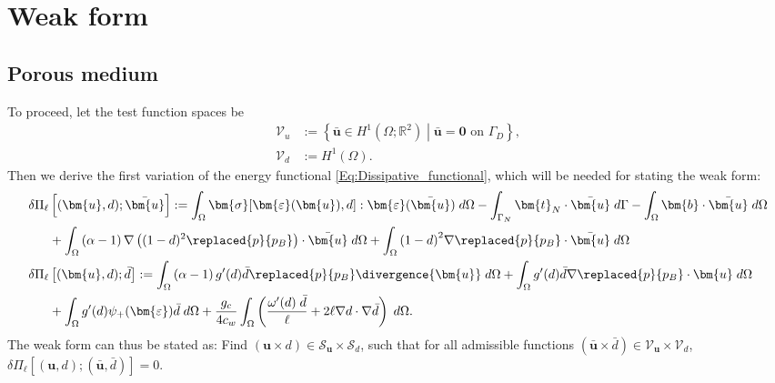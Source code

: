 \section{Weak form }\label{sub:weak_porous}
\subsection{Porous medium}
To proceed, let the test function spaces be
\begin{equation*}
    \begin{aligned}
        \mathscr{V}_u &:= \left\{\bar{\bm{u}}\in H^1\left(\Omega; \mathbb{R}^2\right) \middle|
        \bar{\bm{u}} = \mathbf{0} \text{ on } \Gamma_D
        \right\},\\
        \mathscr{V}_d &:= H^1(\Omega).
    \end{aligned}
\end{equation*}
Then we derive the first variation of the energy functional \eqref{Eq:Dissipative_functional}, which will be needed for stating the weak form:
\begin{equation} \label{Eq:Residual}
    \begin{aligned}
	    \delta \Pi_\ell & \left[(\bm{u}, d); \bar{\bm{u}} \right]
	    := \int_\Omega \bm{\sigma}[\bm{\varepsilon}(\bm{u}), d] : \bm{\varepsilon}(\bar{\bm{u}}) \;d\Omega - \int_{\Gamma_N} \bm{t}_N\cdot \bar{\bm{u}} \; d\Gamma - \int_\Omega \bm{b} \cdot\bar{\bm{u}}\; d\Omega \\
	    &+\int_{\Omega} \left(\alpha-1\right) \nabla \left((1-d)^2  \replaced{p}{p_B}\right) \cdot \bar{\bm{u}} \; d\Omega + \int_{\Omega}  {\left(1 - d\right)}^2\nabla \replaced{p}{p_B}\cdot \bar{\bm{u}}  \; d\Omega
	    \\ \delta \Pi_\ell & \left[(\bm{u}, d);  \bar{d} \right]
	    	    := \int_{\Omega} \left(\alpha-1\right)g'(d)\bar{d} \replaced{p}{p_B} \divergence{\bm{u}} \; d\Omega +	\int_{\Omega} g'(d)\bar{d}   \nabla \replaced{p}{p_B} \cdot {\bm{u}} \; d\Omega 
        \\
	    & + \int_\Omega g'(d) \psi_+(\bm{\varepsilon}) \bar{d}  \; d\Omega +
	    \frac{g_c}{4c_w} \int_\Omega  \left(\frac{\omega'(d)\;\bar{d}}{\ell} + 2\ell \nabla d\cdot\nabla \bar{d} \right)\;d\Omega.
	\end{aligned}
\end{equation}
The weak form can thus be stated as: Find $\left(\bm{u}\times d \right)\in\mathscr{S}_{\bm{u}}\times\mathscr{S}_d$, such that for all admissible functions $\left(\bar{\bm{u}}\times\bar{d} \right)\in\mathscr{V}_{\bm{u}}\times\mathscr{V}_d$, $\delta\Pi_\ell\left[(\bm{u},d); \left(\bar{\bm{u}},\bar{d}\right)\right]=0$.

